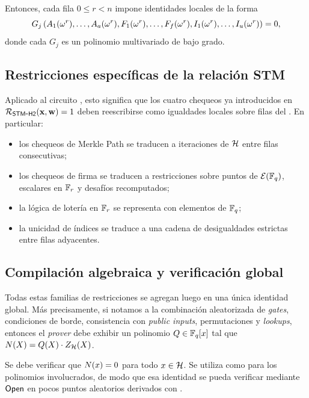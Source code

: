 Entonces, cada fila $0 \leq r < n$ impone identidades locales de la forma
$$G_j \left(A_{1}(\omega^r), \ldots, A_{a}(\omega^r), F_{1}(\omega^r), \ldots, F_{f}(\omega^r), I_{1}(\omega^r), \ldots, I_{u}(\omega^r)\right) = 0,$$
donde cada $G_j$ es un polinomio multivariado de bajo grado.

\subsection{Restricciones específicas de la relación STM}
\label{subsec:stm-halo2-y-complejidad-restricciones-especificas-de-la-relacion-stm}

Aplicado al circuito \STM, esto significa que los cuatro chequeos ya introducidos en $\mathcal{R}_{\mathsf{STM\mbox{-}H2}}(\mathbf{x}, \mathbf{w}) = 1$ deben reescribirse como igualdades locales sobre filas del \Layout. En particular:
\begin{itemize}[noitemsep]
    \item los chequeos de Merkle Path se traducen a iteraciones de $\mathcal{H}$ entre filas consecutivas;
    \item los chequeos de firma se traducen a restricciones sobre puntos de $\mathcal{E}(\mathbb{F}_q)$, escalares en $\mathbb{F}_r$ y desafíos recomputados;
    \item la lógica de lotería en $\mathbb{F}_r$ se representa con elementos de $\mathbb{F}_q$;
    \item la unicidad de índices se traduce a una cadena de desigualdades estrictas entre filas adyacentes.
\end{itemize}

\subsection{Compilación algebraica y verificación global}
\label{subsec:stm-halo2-y-complejidad-compilacion-algebraica-y-verificacion-global}

Todas estas familias de restricciones se agregan luego en una única identidad global. Más precisamente, si notamos \ConstraintNumerator a la combinación aleatorizada de \textit{gates}, condiciones de borde, consistencia con \textit{public inputs}, permutaciones y \textit{lookups}, entonces el \textit{prover} debe exhibir un polinomio $Q \in \mathbb{F}_q[x]$ tal que $N(X) = Q(X) \cdot Z_{\mathcal{H}}(X)$.

Se debe verificar que $N(x) = 0$ para todo $x \in \mathcal{H}$. Se utiliza \KZG como \PCS para los polinomios involucrados, de modo que esa identidad se pueda verificar mediante $\mathsf{Open}$ en pocos puntos aleatorios derivados con \FiatShamir.

